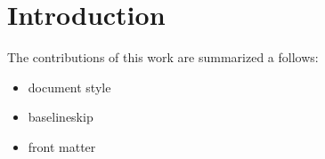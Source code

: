 \section{Introduction}

The contributions of this work are summarized a follows:
\begin{itemize}
\item document style
\item baselineskip
\item front matter
\end{itemize}